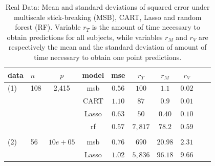 \documentclass{article} %
\newcommand{\dd}[1]{{\color{blue}{\it #1}}}
\begin{document}
\begin{table}[t]
\caption{Real Data: Mean and standard deviations of squared error under multiscale stick-breaking (MSB), CART, Lasso and random forest (RF).  Variable $r_{T}$ is the amount of time necessary to obtain predictions for all subjects, while variables $r_M$ and $r_V$ are respectively the mean and the standard deviation of amount of time necessary to obtain one point predictions.}\label{real}
\vskip 0.15in
\begin{center}
\begin{small}
\begin{sc}
\begin{tabular}{llcccccccc}
\hline
data &$n$&$p$ &model&mse&$r_{T}$ & $r_{M}$ & $r_{V}$\\
\hline
(1)&108&2,415&msb &$0.56$ & $100$ & $1.1$& $0.02$\\
 &&& CART & $1.10$ & $87$ & $0.9$ &$0.01$\\
&&& Lasso & $0.63$  & $50$ & $0.40$ & $0.10$\\
&&& rf & $0.57$ &  $7,817$ & $78.2$ & $0.59$\\
\\
  (2)&56&$10e+05$&msb &$0.76$ & $690$ & $20.98$& $2.31$\\
 &&& Lasso & $1.02$  & $5,836$ & $96.18$ & $9.66$\\
\hline
\end{tabular}
\end{sc}
\end{small}
\end{center}
\vskip -0.1in
\end{table}



\dd{we gotta remove about 10 references to make our reference list fit} 

 
 
\end{document}
